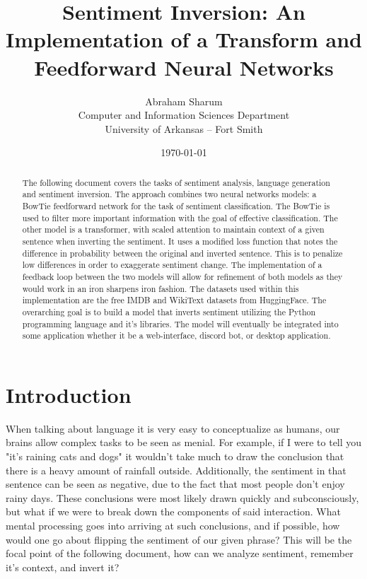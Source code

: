 \documentclass{article}
\title{Sentiment Inversion: An Implementation of a Transform and Feedforward Neural Networks}
\author{Abraham Sharum \\    
	    Computer and Information Sciences Department \\
	    University of Arkansas -- Fort Smith}
\date{\today}
\begin{document}
\maketitle

\begin{abstract}
	The following document covers the tasks of sentiment analysis, language generation and sentiment inversion. The approach combines two neural networks models: a BowTie feedforward network for the task of sentiment classification. The BowTie is used to filter more important information with the goal of effective classification. The other model is a transformer, with scaled attention to maintain context of a given sentence when inverting the sentiment. It uses a modified loss function that notes the difference in probability between the original and inverted sentence. This is to penalize low differences in order to exaggerate sentiment change. The implementation of a feedback loop between the two models will allow for refinement of both models as they would work in an iron sharpens iron fashion. The datasets used within this implementation are the free IMDB and WikiText datasets from HuggingFace. The overarching goal is to build a model that inverts sentiment utilizing the Python programming language and it's libraries. The model will eventually be integrated into some application whether it be a web-interface, discord bot, or desktop application.
\end{abstract}


\section{Introduction}
	 When talking about language it is very easy to conceptualize as humans, our brains allow complex tasks to be seen as menial. For example, if I were to tell you "it's raining cats and dogs" it wouldn't take much to draw the conclusion that there is a heavy amount of rainfall outside. Additionally, the sentiment in that sentence can be seen as negative, due to the fact that most people don't enjoy rainy days. These conclusions were most likely drawn quickly and subconsciously, but what if we were to break down the components of said interaction. What mental processing goes into arriving at such conclusions, and if possible, how would one go about flipping the sentiment of our given phrase? This will be the focal point of the following document, how can we analyze sentiment, remember it's context, and invert it?
\end{document}

